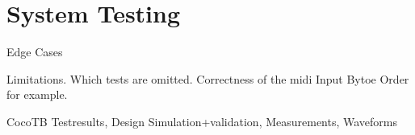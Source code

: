 \newpage
\section{System Testing}\label{sec:test}

Edge Cases

Limitations. Which tests are omitted. Correctness of the midi Input Bytoe Order for example.

CocoTB Testresults, Design Simulation+validation, Measurements, Waveforms

